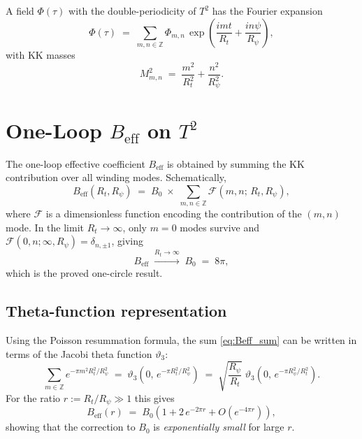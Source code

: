 \documentclass[12pt,a4paper]{article}
\theoremstyle{definition}
\theoremstyle{remark}
\begin{document}
A field $\Phi(\tau)$ with the double-periodicity of $T^2$ has the Fourier
expansion
\begin{equation}
  \Phi(\tau) \;=\; \sum_{m,n \in \mathbb{Z}} \Phi_{m,n}\,
  \exp\!\left(\frac{imt}{R_t} + \frac{in\psi}{R_\psi}\right),
  \label{eq:KK_modes}
\end{equation}
with KK masses
\begin{equation}
  M_{m,n}^2 \;=\; \frac{m^2}{R_t^2} + \frac{n^2}{R_\psi^2}.
  \label{eq:KK_mass}
\end{equation}

\section{One-Loop $B_{\mathrm{eff}}$ on $T^2$}
\label{sec:one_loop}

The one-loop effective coefficient $B_{\mathrm{eff}}$ is obtained by summing
the KK contribution over all winding modes.  Schematically,
\begin{equation}
  B_{\mathrm{eff}}(R_t, R_\psi)
  \;=\; B_0 \;\times\;
  \sum_{m,n \in \mathbb{Z}} \mathcal{F}(m, n;\, R_t, R_\psi),
  \label{eq:Beff_sum}
\end{equation}
where $\mathcal{F}$ is a dimensionless function encoding the contribution of
the $(m,n)$ mode.  In the limit $R_t \to \infty$, only $m = 0$ modes survive
and $\mathcal{F}(0,n;\infty, R_\psi) = \delta_{n,\pm 1}$, giving
\begin{equation}
  B_{\mathrm{eff}} \;\xrightarrow{R_t \to \infty}\;
  B_0 \;=\; 8\pi,
  \label{eq:Beff_limit}
\end{equation}
which is the proved one-circle result.

\subsection{Theta-function representation}

Using the Poisson resummation formula, the sum \eqref{eq:Beff_sum} can be
written in terms of the Jacobi theta function $\vartheta_3$:
\begin{equation}
  \sum_{m \in \mathbb{Z}} e^{-\pi m^2 R_t^2 / R_\psi^2}
  \;=\; \vartheta_3\!\left(0,\, e^{-\pi R_t^2/R_\psi^2}\right)
  \;=\; \sqrt{\frac{R_\psi}{R_t}}\;\vartheta_3\!\left(0,\, e^{-\pi R_\psi^2/R_t^2}\right).
  \label{eq:theta_resum}
\end{equation}
For the ratio $r := R_t / R_\psi \gg 1$ this gives
\begin{equation}
  B_{\mathrm{eff}}(r)
  \;=\; B_0 \left(1 + 2\,e^{-2\pi r} + O(e^{-4\pi r})\right),
  \label{eq:Beff_expansion}
\end{equation}
showing that the correction to $B_0$ is \emph{exponentially small} for large $r$.
\end{document}
